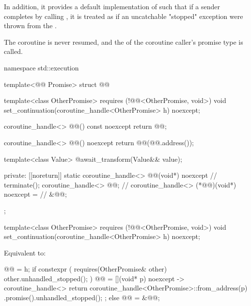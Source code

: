 In addition, it provides a default implementation of 
such that if a sender completes by calling ,
it is treated as if an uncatchable "stopped" exception were thrown
from the .
\begin{note}
The coroutine is never resumed, and
the  of the coroutine caller's promise type is called.
\end{note}

\begin{codeblock}
namespace std::execution {
  template<@@ Promise>
    struct @@ {
      template<class OtherPromise>
        requires (!@@<OtherPromise, void>)
      void set_continuation(coroutine_handle<OtherPromise> h) noexcept;

      coroutine_handle<> @@() const noexcept { return @@; }

      coroutine_handle<> @@() noexcept {
        return @@(@@.address());
      }

      template<class Value>
      @\seebelow@ await_transform(Value&& value);

    private:
      [[noreturn]] static coroutine_handle<>
        @@(void*) noexcept {             // \expos
        terminate();
      }
      coroutine_handle<> @@{};                        // \expos
      coroutine_handle<> (*@@)(void*) noexcept =   // \expos
        &@@;
    };
}
\end{codeblock}

%
\begin{itemdecl}
template<class OtherPromise>
  requires (!@@<OtherPromise, void>)
void set_continuation(coroutine_handle<OtherPromise> h) noexcept;
\end{itemdecl}

\begin{itemdescr}
\pnum
\effects
Equivalent to:
\begin{codeblock}
@@ = h;
if constexpr ( requires(OtherPromise& other) { other.unhandled_stopped(); } ) {
  @@ = [](void* p) noexcept -> coroutine_handle<> {
    return coroutine_handle<OtherPromise>::from_address(p)
      .promise().unhandled_stopped();
  };
} else {
  @@ = &@@;
}
\end{codeblock}
\end{itemdescr}

